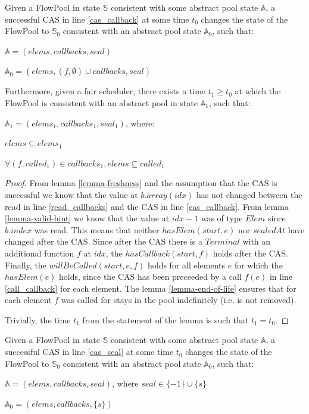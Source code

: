 \documentclass[runningheads,a4paper]{llncs}
\begin{document}
\begin{lemma}\label{lemma-foreach}
Given a FlowPool in state $\mathbb{S}$ consistent with some abstract pool state $\mathbb{A}$, 
a successful CAS in line \ref{cas_callback} at some time $t_0$ changes the state of the FlowPool 
to $\mathbb{S}_0$ consistent with an abstract pool state $\mathbb{A}_0$, such that:

$\mathbb{A} = (elems, callbacks, seal)$

$\mathbb{A}_0 = (elems, (f, \emptyset) \cup callbacks, seal)$

Furthermore, given a fair scheduler, there exists a time $t_1 \geq t_0$ at which the FlowPool 
is consistent with an abstract pool in state $\mathbb{A}_1$, such that:

$\mathbb{A}_1 = (elems_1, callbacks_1, seal_1)$, where:

$elems \subseteq elems_1$

$\forall (f, called_1) \in callbacks_1, elems \subseteq called_1$
\end{lemma}

\begin{proof}
From lemma \ref{lemma-freshness} and the assumption that the CAS is
successful we know that the value at $b.array(idx)$ has not changed
between the read in line \ref{read_callbacks} and the CAS in line
\ref{cas_callback}.
From lemma \ref{lemma-valid-hint} we know that the value at $idx - 1$
was of type $Elem$ since $b.index$ was read.
This means that neither $hasElem(start, e)$ nor $sealedAt$ have changed after the CAS.
Since after the CAS there is a $Terminal$ with an additional function $f$ at $idx$,
the $hasCallback(start, f)$ holds after the CAS.
Finally, the $willBeCalled(start, e, f)$ holds for all elements $e$
for which the $hasElem(e)$ holds, since the CAS has been preceeded by
a call $f(e)$ in line \ref{call_callback} for each element. The lemma
\ref{lemma-end-of-life} ensures that for each element $f$ was called
for stays in the pool indefinitely (i.e. is not removed).

Trivially, the time $t_1$ from the statement of the lemma is such that $t_1 = t_0$.
\end{proof}


\begin{lemma}\label{lemma-seal}
Given a FlowPool in state $\mathbb{S}$ consistent with some abstract pool state $\mathbb{A}$, 
a successful CAS in line \ref{cas_seal} at some time $t_0$ changes the state of the FlowPool 
to $\mathbb{S}_0$ consistent with an abstract pool state $\mathbb{A}_0$, such that:

$\mathbb{A} = (elems, callbacks, seal)$, where $seal \in \{ -1 \} \cup
\{ s \}$

$\mathbb{A}_0 = (elems, callbacks, \{ s \})$
\end{lemma}
\end{document}
